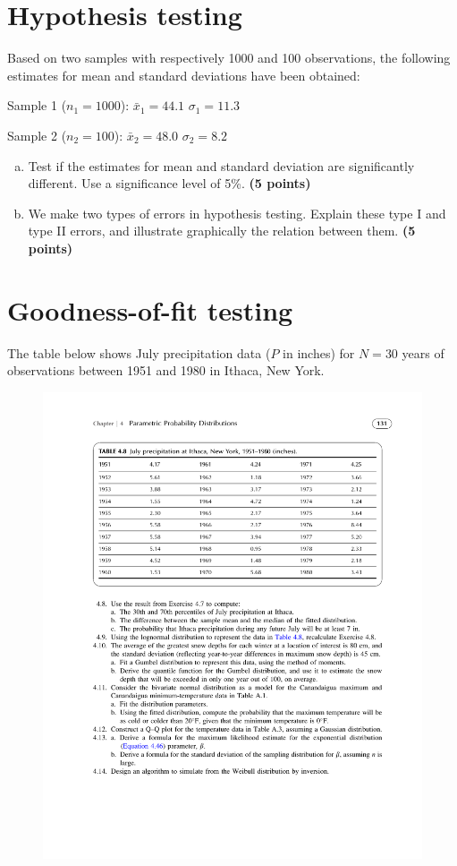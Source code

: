 \documentclass[12pt]{article}
\begin{document}
\section{Hypothesis testing}
Based on two samples with respectively 1000 and 100 observations, the following estimates for mean and standard deviations have been obtained:

Sample 1 ($n_1=1000$): \hspace{0.3in} $\bar{x}_1=44.1$ \hspace{0.3in} $\sigma_1=11.3$

Sample 2 ($n_2=100$): \hspace{0.3in} $\bar{x}_2=48.0$ \hspace{0.3in} $\sigma_2=8.2$


\begin{enumerate}[(a)] 
    \item Test if the estimates for mean and standard deviation are significantly different. Use a significance level of 5\%. \textbf{\hfill (5 points)}
	\item We make two types of errors in hypothesis testing. Explain these type I and type II errors, and illustrate graphically the relation between them. \textbf{\hfill (5 points)}
\end{enumerate}



\section{Goodness-of-fit testing}
The table below shows July precipitation data ($P$ in inches) for $N=30$ years of observations between 1951 and 1980 in Ithaca, New York.

\begin{figure}[h!]
    \centering
    \includegraphics[width=.8\textwidth]{table48} 
\end{figure}
\end{document}
